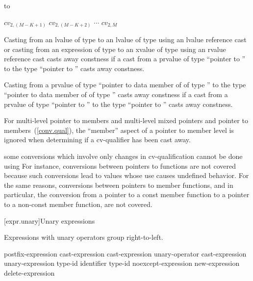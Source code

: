 to

\begin{indented}
$\mathit{cv}_{2,(M-K+1)}$ \tcode{*} $\mathit{cv}_{2,(M-K+2)}$
\tcode{*} $\cdots$ $\mathit{cv}_{2,M}$ \tcode{*}
\end{indented}

\pnum
Casting from an lvalue of type  to an lvalue of type
 using an lvalue reference cast
or casting from an expression of type  to an xvalue of type  using
an rvalue reference cast
casts away constness if a cast from a prvalue of type ``pointer to '' to the type ``pointer to
'' casts away constness.

\pnum
Casting from a prvalue of type ``pointer to data member of  of
type '' to the type ``pointer to data member of  of
type '' casts away constness if a cast from a prvalue of type
``pointer to '' to the type ``pointer to '' casts
away constness.

\pnum
For multi-level pointer to members and multi-level mixed pointers and
pointer to members~(\ref{conv.qual}), the ``member'' aspect of a pointer
to member level is ignored when determining if a 
cv-qualifier has been cast away.

\pnum
\enternote 
some conversions which involve only changes in cv-qualification cannot
be done using  For instance, conversions between
pointers to functions are not covered because such conversions lead to
values whose use causes undefined behavior. For the same reasons,
conversions between pointers to member functions, and in particular, the
conversion from a pointer to a const member function to a pointer to a
non-const member function, are not covered.
\exitnote%

[expr.unary]{Unary expressions}

\pnum
{}%
Expressions with unary operators group right-to-left.

%
%
%
%
%
\begin{bnf}
\br
    postfix-expression\br
    \terminal{++} cast-expression\br
    \terminal{-{-}} cast-expression\br
    unary-operator cast-expression\br
     unary-expression\br
     type-id \terminal{)}\br
     \terminal{(} identifier \terminal{)}\br
     type-id \terminal{)}\br
    noexcept-expression\br
    new-expression\br
    delete-expression\br
\end{bnf}

